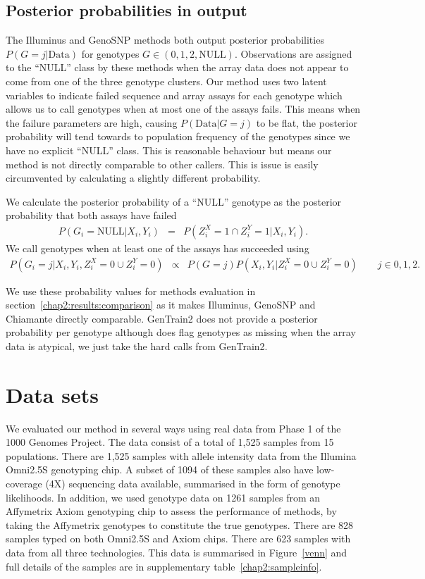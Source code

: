 \subsection{Posterior probabilities in output}
The Illuminus and GenoSNP methods both output posterior probabilities $P(G=j|\textrm{Data})$ for genotypes $G \in (0,1,2,\textrm{NULL})$. Observations are assigned to the ``NULL'' class by these methods when the array data does not appear to come from one of the three genotype clusters.  Our method uses two latent variables to indicate failed sequence and array assays for each genotype which allows us to call genotypes when at most one of the assays fails. This means when the failure parameters are high, causing $P(\textrm{Data}|G=j)$ to be flat, the posterior probability will tend towards to population frequency of the genotypes since we have no explicit ``NULL'' class.  This is reasonable behaviour but means our method is not directly comparable to other callers.  This is issue is easily circumvented by calculating a slightly different probability.

We calculate the posterior probability of a ``NULL'' genotype as the posterior probability that both assays have failed
\begin{eqnarray*}
P(G_i = \textrm{NULL}|X_i,Y_i)  &=& P(Z_i^X=1 \cap Z_i^Y=1|X_i,Y_i).
\end{eqnarray*}
We call genotypes when at least one of the assays has succeeded using
\begin{eqnarray*}
 P(G_i = j|X_i,Y_i,Z_i^X=0 \cup Z_i^Y=0) &\propto& P(G=j) P(X_i,Y_i|Z_i^X=0 \cup Z_i^Y=0) \qquad j \in {0,1,2}.
\end{eqnarray*}

We use these probability values for methods evaluation in section~\ref{chap2:results:comparison} as it makes Illuminus, GenoSNP and Chiamante directly comparable. GenTrain2 does not provide a posterior probability per genotype although does flag genotypes as missing when the array data is atypical, we just take the hard calls from GenTrain2.


\section{Data sets}
\label{chap2:data}
We evaluated our method in several ways using real data from Phase 1 of the 1000 Genomes Project. The data consist of a total of 1,525 samples from 15 populations. There are 1,525 samples with allele intensity data from the Illumina Omni2.5S genotyping chip. A subset of 1094 of these samples also have low-coverage (4X) sequencing data available, summarised in the form of genotype likelihoods.   In addition, we used genotype data on 1261 samples from an Affymetrix Axiom genotyping chip to assess the performance of methods, by taking the Affymetrix genotypes to constitute the true genotypes. There are 828 samples typed on both Omni2.5S and Axiom chips. There are 623 samples with data from all three technologies. This data is summarised in Figure~\ref{venn} and full details of the samples are in supplementary table~\ref{chap2:sampleinfo}.

